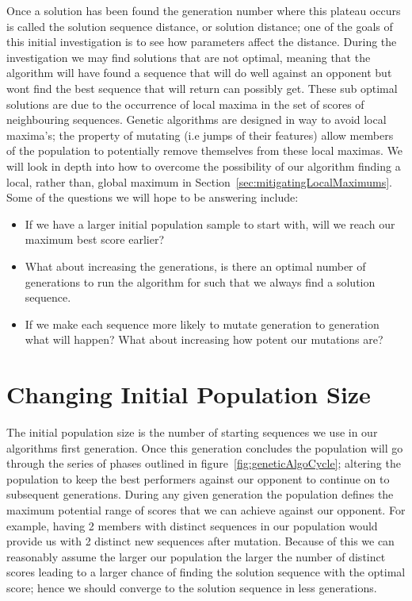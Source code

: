 Once a solution has been found the generation number where this plateau occurs is called the solution sequence distance, or solution distance;
one of the goals of this initial investigation is to see how parameters affect the distance.
During the investigation we may find solutions that are not optimal, meaning that the algorithm will have found a sequence that will do well against an opponent but wont find the best sequence that will return can possibly get.
These sub optimal solutions are due to the occurrence of local maxima in the set of scores of neighbouring sequences.
Genetic algorithms are designed in way to avoid local maxima's;
the property of mutating (i.e jumps of their features) allow members of the population to potentially remove themselves from these local maximas.
We will look in depth into how to overcome the possibility of our algorithm finding a local, rather than, global maximum in Section~\ref{sec:mitigatingLocalMaximums}.
Some of the questions we will hope to be answering include:
\begin{itemize}
    \item If we have a larger initial population sample to start with, will we reach our maximum best score earlier?
    \item What about increasing the generations, is there an optimal number of generations to run the algorithm for such that we always find a solution sequence.
    \item If we make each sequence more likely to mutate generation to generation what will happen?
    What about increasing how potent our mutations are?
\end{itemize}

\section{Changing Initial Population Size}\label{sec:ChangingInitialPopulationSize}
The initial population size is the number of starting sequences we use in our algorithms first generation.
Once this generation concludes the population will go through the series of phases outlined in figure~\ref{fig:geneticAlgoCycle}; altering the population to keep the best performers against our opponent to continue on to subsequent generations.
During any given generation the population defines the maximum potential range of scores that we can achieve against our opponent.
For example, having 2 members with distinct sequences in our population would provide us with 2 distinct new sequences after mutation.
Because of this we can reasonably assume the larger our population the larger the number of distinct scores leading to a larger chance of finding the solution sequence with the optimal score;
hence we should converge to the solution sequence in less generations.\\

